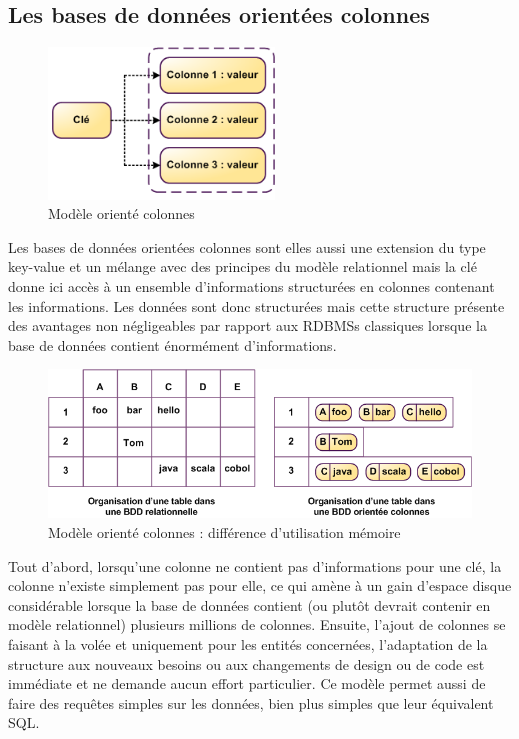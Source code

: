 \documentclass[11pt]{article}
\begin{document}
\subsection{Les bases de données orientées colonnes}
\begin{figure}[H]
  \centering
  \begin{center}
    \includegraphics[width=6cm]{columns.png}
  \end{center}
  \caption{Modèle orienté colonnes\cite{tourhorizon}}
\end{figure}
Les bases de données orientées colonnes sont elles aussi une extension du type key-value et un mélange avec des principes du modèle relationnel mais la clé donne ici accès à un ensemble d'informations structurées en colonnes contenant les informations. Les données sont donc structurées mais cette structure présente des avantages non négligeables par rapport aux RDBMSs classiques lorsque la base de données contient énormément d'informations.
\begin{figure}[H]
  \centering
  \begin{center}
    \includegraphics[width=12cm]{nosql-colonnes.png}
  \end{center}
  \caption{Modèle orienté colonnes : différence d'utilisation mémoire\cite{tourhorizon}}
\end{figure}
Tout d'abord, lorsqu'une colonne ne contient pas d'informations pour une clé, la colonne n'existe simplement pas pour elle, ce qui amène à un gain d'espace disque considérable lorsque la base de données contient (ou plutôt devrait contenir en modèle relationnel) plusieurs millions de colonnes. Ensuite, l'ajout de colonnes se faisant à la volée et uniquement pour les entités concernées, l'adaptation de la structure aux nouveaux besoins ou aux changements de design ou de code est immédiate et ne demande aucun effort particulier. Ce modèle permet aussi de faire des requêtes simples sur les données, bien plus simples que leur équivalent SQL.
\end{document}
